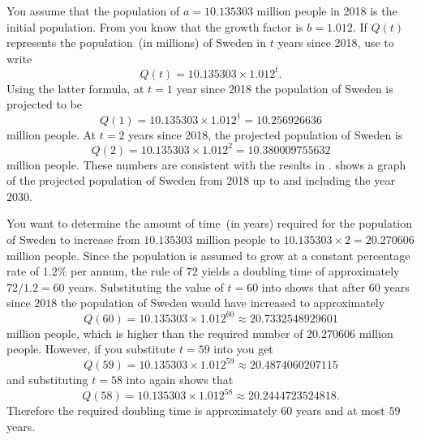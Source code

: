 \documentclass[a4paper,oneside,12pt]{article}
\begin{document}
{\begin{solution}
You assume that the population of $a = 10.135303$ million people in
2018 is the initial population.
From  you know that
the growth factor is $b = 1.012$.  If $Q(t)$ represents the
population~(in millions) of Sweden in $t$ years since 2018, use
 to write
\begin{equation}
\label{eqn:Sweden_population_formula}
Q(t)
=
10.135303 \times 1.012^t.
\end{equation}
Using the latter formula, at $t = 1$ year since 2018 the population of
Sweden is projected to be
\[
Q(1)
=
10.135303 \times 1.012^1
=
10.256926636
\]
million people.  At $t = 2$ years since 2018, the projected population
of Sweden is
\[
Q(2)
=
10.135303 \times 1.012^2
=
10.380009755632
\]
million people.  These numbers are consistent with the results
in .
 shows a graph of the projected
population of Sweden from 2018 up to and including the year 2030.

You want to determine the amount of time~(in years) required for the
population of Sweden to increase from $10.135303$ million people to
$10.135303 \times 2 = 20.270606$ million people.  Since the population
is assumed to grow at a constant percentage rate of $1.2\%$ per annum,
the rule of $72$ yields a doubling time of approximately
$72 / 1.2 = 60$ years.  Substituting the value of $t = 60$ into
 shows that after $60$ years
since $2018$ the population of Sweden would have increased to
approximately
\[
Q(60)
=
10.135303 \times 1.012^{60}
\approx
20.7332548929601
\]
million people, which is higher than the required number of
$20.270606$ million people.  However, if you substitute $t = 59$ into
 you get
\[
Q(59)
=
10.135303 \times 1.012^{59}
\approx
20.4874060207115
\]
and substituting $t = 58$ into
 again shows that
\[
Q(58)
=
10.135303 \times 1.012^{58}
\approx
20.2444723524818.
\]
Therefore the required doubling time is approximately $60$ years and
at most $59$ years.
\end{solution}
}{}
\end{document}
